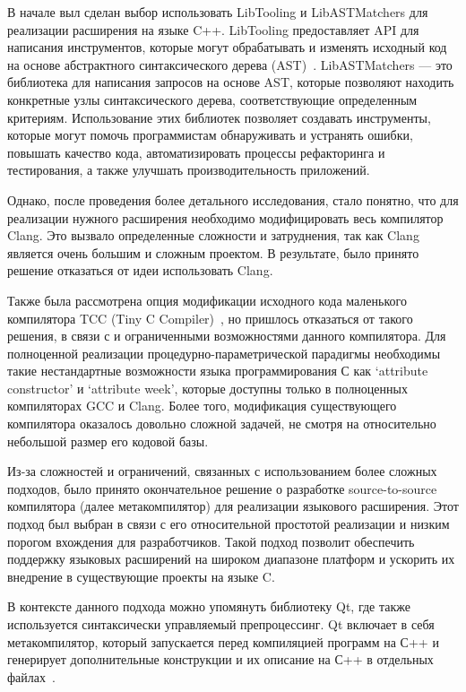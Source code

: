 В начале выл сделан выбор использовать LibTooling и LibASTMatchers для реализации расширения на языке C++.
LibTooling предоставляет API для написания инструментов, которые могут обрабатывать и изменять исходный код на основе абстрактного синтаксического дерева (AST)~\cite{LibTooling}. LibASTMatchers --- это библиотека для написания запросов на основе AST, которые позволяют находить конкретные узлы синтаксического дерева, соответствующие определенным критериям.
Использование этих библиотек позволяет создавать инструменты, которые могут помочь программистам обнаруживать и устранять ошибки, повышать качество кода, автоматизировать процессы рефакторинга и тестирования, а также улучшать производительность приложений.

Однако, после проведения более детального исследования, стало понятно, что для реализации нужного расширения необходимо модифицировать весь компилятор Clang. Это вызвало определенные сложности и затруднения, так как Clang является очень большим и сложным проектом. В результате, было принято решение отказаться от идеи использовать Clang.

Также была рассмотрена опция модификации исходного кода маленького компилятора TCC (Tiny C Compiler)~\cite{bellard2003tcc}, но пришлось отказаться от такого решения, в связи с и ограниченными возможностями данного компилятора.
Для полноценной реализации процедурно-параметрической парадигмы необходимы такие нестандартные возможности языка программирования С как `attribute constructor' и `attribute week', которые доступны  только в полноценных компиляторах GCC и Clang.
Более того, модификация существующего компилятора оказалось довольно сложной задачей, не смотря на относительно небольшой размер его кодовой базы.

Из-за сложностей и ограничений, связанных с использованием более сложных подходов, было принято окончательное решение о разработке source-to-source компилятора (далее метакомпилятор) для реализации языкового расширения.
Этот подход был выбран в связи с его относительной простотой реализации и низким порогом вхождения для разработчиков.
Такой подход позволит обеспечить поддержку языковых расширений на широком диапазоне платформ и ускорить их внедрение в существующие проекты на языке C.

В контексте данного подхода можно упомянуть библиотеку Qt, где также используется синтаксически управляемый препроцессинг. Qt включает в себя метакомпилятор, который запускается перед компиляцией программ на С++ и генерирует дополнительные конструкции и их описание на С++ в отдельных файлах~\cite{qtUsingMetaObject}.

